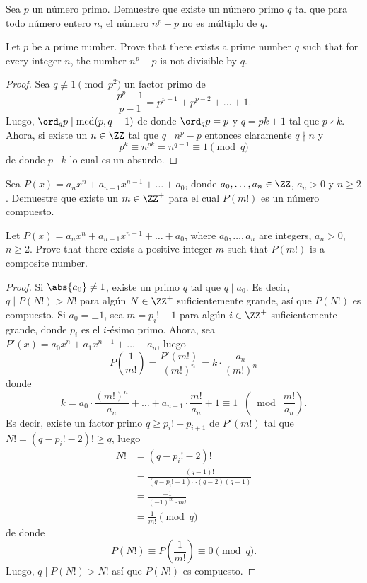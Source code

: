 \begin{probEG}
	Sea $p$ un número primo. Demuestre que existe un número primo $q$ tal que para todo número entero $n$, el número $n^p-p$ no es múltiplo de $q$.
	\begin{hint}
		Let $p$ be a prime number. Prove that there exists a prime number $q$ such that for every integer $n$, the number $n^p-p$ is not divisible by $q$.
	\end{hint}
\end{probEG}

\begin{proof}
	Sea $q\not\equiv 1\pmod{p^2}$ un factor primo de
	\[\frac{p^p-1}{p-1}=p^{p-1}+p^{p-2}+\dots+1.\]
	Luego, $\ord_qp\mid\mcd(p,q-1)$ de donde $\ord_qp=p$ y $q=pk+1$ tal que $p\nmid k$. Ahora, si existe un $n\in\ZZ$ tal que $q\mid n^p-p$ entonces claramente $q\nmid n$ y
	\[p^k\equiv n^{pk}=n^{q-1}\equiv 1\pmod q\]
	de donde $p\mid k$ lo cual es un absurdo.
\end{proof}

\begin{probMG}[ISL 2005/N7]
	Sea $P(x)=a_nx^n+a_{n-1}x^{n-1}+\dots+a_0$, donde $a_0,\dots,a_n\in\ZZ$, $a_n>0$ y $n\ge 2$. Demuestre que existe un $m\in\ZZ^+$ para el cual $P(m!)$ es un número compuesto.
	\begin{hint}
		Let $P(x)=a_nx^n+a_{n-1}x^{n-1}+\dots+a_0$, where $a_0,\dots,a_n$ are integers, $a_n>0$, $n\ge 2$. Prove that there exists a positive integer $m$ such that $P(m!)$ is a composite number.
	\end{hint}
\end{probMG}

\begin{proof}
	Si $\abs{a_0}\ne 1$, existe un primo $q$ tal que $q\mid a_0$. Es decir, $q\mid P(N!)>N!$ para algún $N\in\ZZ^+$ suficientemente grande, así que $P(N!)$ es compuesto. Si $a_0=\pm 1$, sea $m=p_i!+1$ para algún $i\in\ZZ^+$ suficientemente grande, donde $p_i$ es el $i$-ésimo primo. Ahora, sea $P'(x)=a_0x^n+a_1x^{n-1}+\dots+a_n$, luego
	\[P\left(\frac{1}{m!}\right)=\frac{P'(m!)}{(m!)^n}=k\cdot\frac{a_n}{(m!)^n}\]
	donde
	\[k=a_0\cdot\frac{(m!)^n}{a_n}+\dots+a_{n-1}\cdot\frac{m!}{a_n}+1\equiv 1\;\;\left(\bmod\ \frac{m!}{a_n}\right).\]
	Es decir, existe un factor primo $q\ge p_i!+p_{i+1}$ de $P'(m!)$ tal que $N!=(q-p_i!-2)!\ge q$, luego
	\begin{align*}
		N!&=(q-p_i!-2)!\\
		&=\frac{(q-1)!}{(q-p_i!-1)\cdots(q-2)(q-1)}\\
		&\equiv\frac{-1}{(-1)^m\cdot m!}\\
		&=\frac{1}{m!}\pmod q
	\end{align*}
	de donde
	\[P(N!)\equiv P\left(\frac{1}{m!}\right)\equiv 0\pmod q.\]
	Luego, $q\mid P(N!)>N!$ así que $P(N!)$ es compuesto.
\end{proof}

